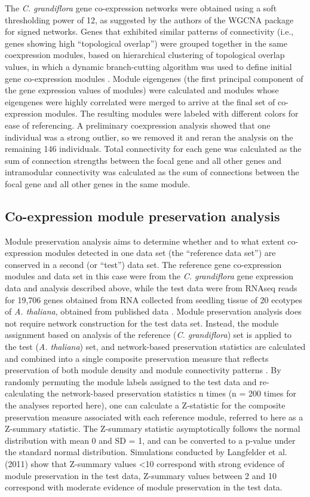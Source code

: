 The \textit{C. grandiflora} gene co-expression networks were obtained using  a soft thresholding power of 12, as suggested by the authors of the WGCNA package for signed networks. Genes that exhibited similar patterns of connectivity (i.e., genes showing high “topological overlap”) were grouped together in the same coexpression modules, based on hierarchical clustering of topological overlap values, in which a dynamic branch-cutting algorithm was used to define initial gene co-expression modules \citep{langfelder2008}.  Module eigengenes (the first principal component of the gene expression values of modules) were calculated and modules whose eigengenes were highly correlated were merged to arrive at the final set of co-expression modules. The resulting modules were labeled with different colors for ease of referencing. A preliminary coexpression analysis showed that one individual was a strong outlier, so we removed it and reran the analysis on the remaining 146 individuals. Total connectivity for each gene was calculated as the sum of connection strengths between the focal gene and all other genes and intramodular connectivity was calculated as the sum of connections between the focal gene and all other genes in the same module. 

\subsection{Co-expression module preservation analysis}
Module preservation analysis aims to determine whether and to what extent co-expression modules detected in one data set (the “reference data set”) are conserved in a second (or “test”) data set. The reference gene co-expression modules and data set in this case were from the \textit{C. grandiflora} gene expression data and analysis described above, while the test data were from RNAseq reads for 19,706 genes obtained from RNA collected from seedling tissue of 20 ecotypes of \textit{A. thaliana}, obtained from published data \citep{Gan2011-xv}. Module preservation analysis does not require network construction for the test data set. Instead, the module assignment based on analysis of the reference (\textit{C. grandiflora}) set is applied to the test (\textit{A. thaliana}) set, and network-based preservation statistics are calculated and combined into a single composite preservation measure that reflects preservation of both module density and module connectivity patterns \citep{langfelder2011}. By randomly permuting the module labels assigned to the test data and re-calculating the network-based preservation statistics n times (n = 200 times for the analyses reported here), one can calculate a Z-statistic for the composite preservation measure associated with each reference module, referred to here as a Z-summary statistic.  The Z-summary statistic asymptotically follows the normal distribution with mean 0 and SD = 1, and can be converted to a p-value under the standard normal distribution.  Simulations conducted by Langfelder et al. (2011) show that Z-summary values \textless 10 correspond with strong evidence of module preservation in the test data, Z-summary values between 2 and 10 correspond with moderate evidence of module preservation in the test data.

